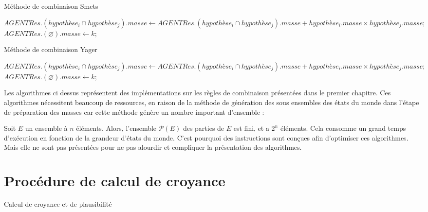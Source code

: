 \begin{algorithm}[H]
\setcounter{AlgoLine}{3}
\caption{Méthode de combinaison Smets}

$AGENTRes.(hypothèse_{i} \cap hypothèse_{j}).masse \gets AGENTRes.(hypothèse_{i} \cap hypothèse_{j}).masse + hypothèse_{i}.masse \times hypothèse_{j}.masse ;$
$AGENTRes.(\varnothing ).masse \gets k;$
\end{algorithm}
\vspace{6em}
\begin{algorithm}[H]
\setcounter{AlgoLine}{9}
\caption{Méthode de combinaison Yager}
$AGENTRes.(hypothèse_{i} \cap hypothèse_{j}).masse \gets AGENTRes.(hypothèse_{i} \cap hypothèse_{j}).masse + hypothèse_{i}.masse \times hypothèse_{j}.masse ;$
$AGENTRes.(\varnothing ).masse \gets k;$
\end{algorithm}
\vspace{6em}
Les algorithmes ci dessus représentent des implémentations sur les règles de combinaison présentées dans le premier chapitre. Ces algorithmes nécessitent beaucoup de ressources, en raison de la méthode de génération des sous ensembles des états du monde dans l'étape de préparation des masses car cette méthode génère un nombre important d'ensemble :

Soit $E$ un ensemble à $n$ éléments. Alors, l'ensemble $\mathcal{P}(E)$ des parties de $E$ est fini, et a \textbf{$2^n$} éléments.
 \newpage
\vspace{4em}
Cela consomme un grand temps d'exécution en fonction de la grandeur d'états du monde. C'est pourquoi des instructions sont conçues afin  d'optimiser ces algorithmes. Mais elle ne sont pas présentées pour ne pas alourdir et compliquer la présentation des algorithmes.
\vspace{2em}
\section{Procédure de calcul de croyance}
\vspace{2em}
\begin{algorithm}[H]
\caption{Calcul de croyance et de plausibilité}
\BlankLine
{}
\BlankLine 
\Begin

\end{algorithm}
